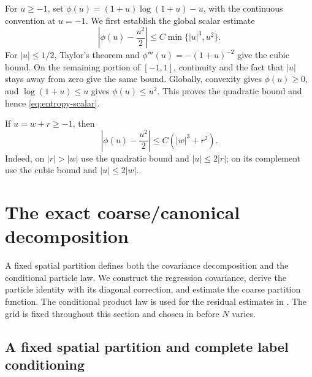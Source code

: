 \documentclass[11pt,reqno]{amsart}
\numberwithin{equation}{section}
\theoremstyle{plain}
\theoremstyle{definition}
\begin{document}
For $u\geq-1$, set $\phi(u)=(1+u)\log(1+u)-u$, with the continuous convention at $u=-1$.  We first establish the global scalar estimate
\begin{equation}\label{eq:entropy-scalar}
 \left|\phi(u)-\frac{u^2}{2}\right|
 \leq C\min\{|u|^3,u^2\}.
\end{equation}
For $|u|\leq1/2$, Taylor's theorem and $\phi'''(u)=-(1+u)^{-2}$ give the cubic bound.  On the remaining portion of $[-1,1]$, continuity and the fact that $|u|$ stays away from zero give the same bound.  Globally, convexity gives $\phi(u)\geq0$, and $\log(1+u)\leq u$ gives $\phi(u)\leq u^2$.  This proves the quadratic bound and hence \eqref{eq:entropy-scalar}.

If $u=w+r\geq-1$, then
\begin{equation}\label{eq:entropy-split}
 \left|\phi(u)-\frac{u^2}{2}\right|\leq C(|w|^3+r^2).
\end{equation}
Indeed, on $|r|>|w|$ use the quadratic bound and $|u|\leq2|r|$; on its complement use the cubic bound and $|u|\leq2|w|$.

\section{The exact coarse/canonical decomposition}
\label{sec:coarse-decomposition}

A fixed spatial partition defines both the covariance decomposition and the conditional particle law. We construct the regression covariance, derive the particle identity with its diagonal correction, and estimate the coarse partition function. The conditional product law is used for the residual estimates in . The grid is fixed throughout this section and chosen in  before $N$ varies.

\subsection{A fixed spatial partition and complete label conditioning}
\label{subsec:cell-labels}
\end{document}
